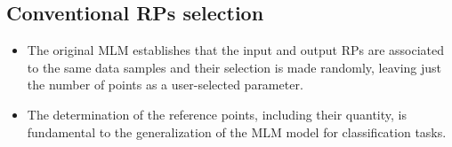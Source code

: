 \documentclass[final]{beamer}
\begin{document}
\begin{frame}[t]
\begin{multicols}{3}
\section{Conventional RPs selection}

\begin{itemize}
    \item The original MLM establishes that the input and output RPs are associated to the same data samples and their selection is made randomly, leaving just the number of points as a user-selected parameter.
    \item The determination of the reference points, including their quantity, is fundamental to the generalization of the MLM model for classification tasks.

\end{itemize}


\newpage


\end{multicols}
\end{frame}
\end{document}
